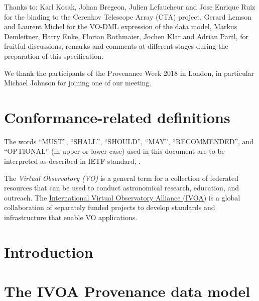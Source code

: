 \documentclass[11pt,a4paper]{ivoa}
\begin{document}
Thanks to: Karl Kosak, Johan Bregeon, Julien Lefaucheur and Jose Enrique Ruiz 
for the binding to the Cerenkov Telescope Array (CTA) project, Gerard
Lemson and Laurent Michel for the VO-DML expression of the data model, Markus Demleitner,
Harry Enke, Florian Rothmaier, Jochen Klar and Adrian Partl,
for fruitful discussions, remarks and comments at different stages during the preparation of this specification.

We thank the participants of the Provenance Week 2018 in London, in particular Michael Johnson for joining one of our meeting.

\section*{Conformance-related definitions}

The words ``MUST'', ``SHALL'', ``SHOULD'', ``MAY'', ``RECOMMENDED'', and
``OPTIONAL'' (in upper or lower case) used in this document are to be
interpreted as described in IETF standard, \citet{std:RFC2119}.

The \emph{Virtual Observatory (VO)} is
a general term for a collection of federated resources that can be used
to conduct astronomical research, education, and outreach.
The \href{http://www.ivoa.net}{International
Virtual Observatory Alliance (IVOA)} is a global
collaboration of separately funded projects to develop standards and
infrastructure that enable VO applications.

\section{Introduction}
\label{sec:intro}





\clearpage
\section{The IVOA Provenance data model}
\label{sec:datamodel}


%
%
\end{document}
